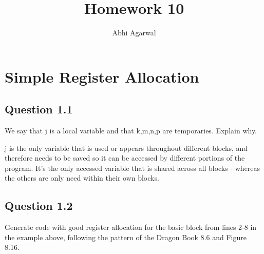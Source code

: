 \documentclass[11pt, oneside]{article}   	%
\title{Homework 10}
\author{Abhi Agarwal}
\date{}
\begin{document}
\maketitle

\section{Simple Register Allocation}

\subsection*{Question 1.1} 
\par We say that j is a local variable and that k,m,n,p are temporaries. Explain why.
\par j is the only variable that is used or appears throughout different blocks, and therefore needs to be saved so it can be accessed by different portions of the program. It's the only accessed variable that is shared across all blocks - whereas the others are only need within their own blocks. 

\subsection*{Question 1.2}
\par Generate code with good register allocation for the basic block from lines 2-8 in the example above, following the pattern of the Dragon Book 8.6 and Figure 8.16.
\end{document}
